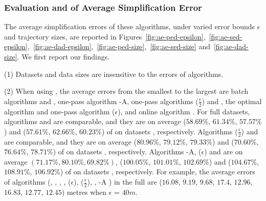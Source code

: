 




\subsubsection{Evaluation and  of Average Simplification Error}
\label{sec-ae}
The average simplification errors of these algorithms, under varied error bounds $\epsilon$ and trajectory sizes, are reported in Figures~\ref{fig:ae-ped-epsilon},~\ref{fig:ae-sed-epsilon},~\ref{fig:ae-dad-epsilon},~\ref{fig:ae-ped-size},~\ref{fig:ae-sed-size} and~\ref{fig:ae-dad-size}.
We first report our findings.







\sstab (1) {Datasets {and data sizes} are insensitive to the errors of \lsa algorithms.}

\sstab (2) When using \ped, the average errors from the smallest
to the largest are batch algorithms \tpa and \dpa, one-pass
algorithm {\operb-A}, one-pass
algorithms \siped($\frac{\epsilon}{2}$) and \operb, the optimal algorithm \opt and one-pass algorithm \siped(${\epsilon}$), and online algorithm \bqsa.
%
For full datasets, algorithms \tpa and \dpa are comparable, and they are on average ($58.69\%$, $61.34\%$,
$57.57\%$) and ($57.61\%$, $62.66\%$, $60.23\%$) of \opt on datasets \dSets, respectively.
Algorithms \siped($\frac{\epsilon}{2}$) and \operb are comparable, and they are on average
($80.96\%$, $79.12\%$, $79.33\%$) and ($70.60\%$, $76.64\%$, $78.71\%$) of \opt on datasets \dSets, respectively.
%
Algorithms {\operb-A}, \siped(${\epsilon}$) and \bqsa are on average {$(71.17\%, 80.10\%, 69.82\%)$}, ($100.05\%$, $101.01\%$, $102.69\%$) and ($104.67\%$, $108.91\%$, $106.92\%$) of \opt on datasets \dSets, respectively.
For example, the average errors of algorithms
(\opt, \tpa, \dpa, \bqsa, \siped(${\epsilon}$), \siped($\frac{\epsilon}{2}$), \operb, {\operb-A} ) in the full \mopsi are ($16.08$, $9.19$, $9.68$, $17.4$, $12.96$, $16.83$, $12.77$, {$12.45$}) metres when $\epsilon$ = $40m$.

